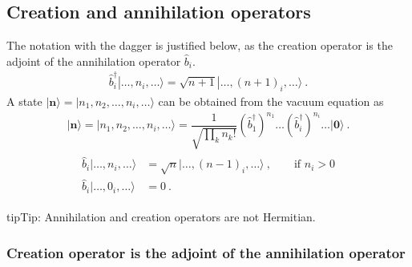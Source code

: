 \documentclass[letterpaper,10pt,english]{jupyterBook}
\begin{document}
\subsection{Creation and annihilation operators}
\label{\detokenize{ch/quantum-mechanics/many-body/bosons:creation-and-annihilation-operators}}\label{\detokenize{ch/quantum-mechanics/many-body/bosons:quantum-mechanics-second-quantizazion-bosons-creation-annihilation}}
\sphinxAtStartPar
{} The notation with the dagger is justified below, as the creation operator is the adjoint of the annihilation operator \(\hat{b}_i\).
\begin{equation*}
\begin{split}\hat{b}_i^{\dagger} | \dots, n_i, \dots \rangle = \sqrt{n+1} | \dots, (n+1)_i, \dots \rangle \ .\end{split}
\end{equation*}
\sphinxAtStartPar
A state \(| \mathbf{n} \rangle = | n_1, n_2, \dots, n_i, \dots \rangle\) can be obtained from the vacuum equation as
\begin{equation*}
\begin{split}| \mathbf{n} \rangle = | n_1, n_2, \dots, n_i, \dots \rangle = \dfrac{1}{\sqrt{\prod_k n_k!}} \left( \hat{b}_1^{\dagger} \right)^{n_1} \dots \left( \hat{b}_i^\dagger \right)^{n_i} \dots | \mathbf{0} \rangle \ .\end{split}
\end{equation*}
\sphinxAtStartPar
{}
\begin{equation*}
\begin{split}\begin{aligned}
  \hat{b}_i | \dots, n_i, \dots \rangle & = \sqrt{n} | \dots, (n-1)_i, \dots \rangle \ , \qquad \text{if $n_i > 0$} \\
  \hat{b}_i | \dots, 0_i, \dots \rangle & = 0 \ .
\end{aligned}\end{split}
\end{equation*}
\begin{sphinxadmonition}{tip}{Tip:}
\sphinxAtStartPar
Annihilation and creation operators are not Hermitian.
\end{sphinxadmonition}
\subsubsection*{Creation operator is the adjoint of the annihilation operator}
\end{document}

